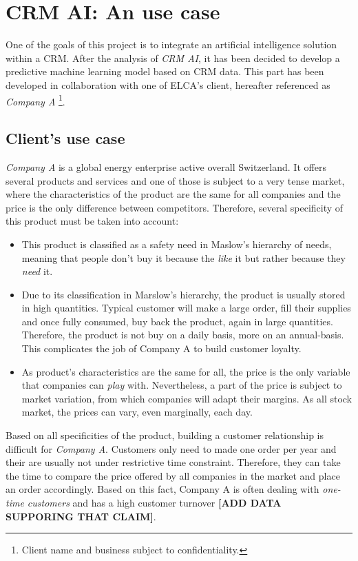 \chapter{CRM AI: An use case}

One of the goals of this project is to integrate an artificial intelligence solution within a CRM. After the analysis of \textit{CRM AI}, it has been decided to develop a predictive machine learning model based on CRM data. This part has been developed in collaboration with one of ELCA's client, hereafter referenced as \textit{Company A} \footnote{Client name and business subject to confidentiality.}.


\section{Client's use case} \label{use-case}
\textit{Company A} is a global energy enterprise active overall Switzerland. It offers several products and services and one of those is subject to a very tense market, where the characteristics of the product are the same for all companies and the price is the only difference between competitors. Therefore, several specificity of this product must be taken into account:
\begin{itemize}
\item This product is classified as a safety need in Maslow's hierarchy of needs\cite{wiki:Maslow's_hierarchy_of_needs}, meaning that people don't buy it because the \textit{like} it but rather because they \textit{need} it. 
\item Due to its classification in Marslow's hierarchy, the product is usually stored in high quantities. Typical customer will make a large order, fill their supplies and once fully consumed, buy back the product, again in large quantities. Therefore, the product is not buy on a daily basis, more on an annual-basis. This complicates the job of Company A to build customer loyalty.
\item As product's characteristics are the same for all, the price is the only variable that companies can \textit{play} with. Nevertheless, a part of the price is subject to market variation, from which companies will adapt their margins. As all stock market, the prices can vary, even marginally, each day.
\end{itemize}
 
 Based on all specificities of the product, building a customer relationship is difficult for \textit{Company A}. Customers only need to made one order per year and their are usually not under restrictive time constraint. Therefore, they can take the time to compare the price offered by all companies in the market and place an order accordingly. Based on this fact, Company A is often dealing with \textit{one-time customers} and has a high customer turnover \textbf{[ADD DATA SUPPORING THAT CLAIM]}.
 
